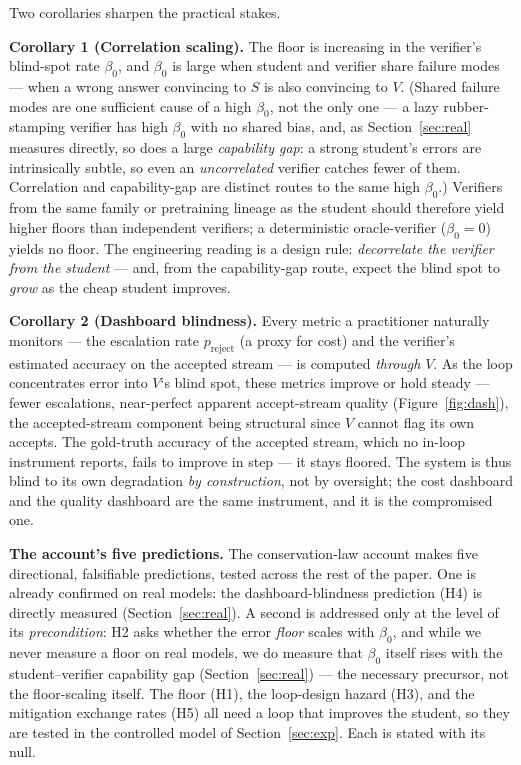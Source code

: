 \documentclass[11pt]{article}
\begin{document}
Two corollaries sharpen the practical stakes.

\textbf{Corollary 1 (Correlation scaling).} The floor is increasing in
the verifier's blind-spot rate \(\beta_{0}\), and \(\beta_{0}\) is large
when student and verifier share failure modes --- when a wrong answer
convincing to \(S\) is also convincing to \(V\). (Shared failure modes
are one sufficient cause of a high \(\beta_{0}\), not the only one --- a
lazy rubber-stamping verifier has high \(\beta_{0}\) with no shared
bias, and, as Section~\ref{sec:real} measures directly, so does a large
\emph{capability gap}: a strong student's errors are intrinsically
subtle, so even an \emph{uncorrelated} verifier catches fewer of them.
Correlation and capability-gap are distinct routes to the same high
\(\beta_{0}\).) Verifiers from the same family or pretraining lineage as
the student should therefore yield higher floors than independent
verifiers; a deterministic oracle-verifier (\(\beta_{0} = 0\)) yields no
floor. The engineering reading is a design rule: \emph{decorrelate the
verifier from the student} --- and, from the capability-gap route,
expect the blind spot to \emph{grow} as the cheap student improves.

\textbf{Corollary 2 (Dashboard blindness).} Every metric a practitioner
naturally monitors --- the escalation rate \(p_{\text{reject}}\) (a
proxy for cost) and the verifier's estimated accuracy on the accepted
stream --- is computed \emph{through} \(V\). As the loop concentrates
error into \(V\)`s blind spot, these metrics improve or hold steady ---
fewer escalations, near-perfect apparent accept-stream quality
(Figure~\ref{fig:dash}), the accepted-stream component being structural
since \(V\) cannot flag its own accepts. The gold-truth accuracy of the
accepted stream, which no in-loop instrument reports, fails to improve
in step --- it stays floored. The system is thus blind to its own
degradation \emph{by construction}, not by oversight; the cost dashboard
and the quality dashboard are the same instrument, and it is the
compromised one.

\textbf{The account's five predictions.} The conservation-law account
makes five directional, falsifiable predictions, tested across the rest
of the paper. One is already confirmed on real models: the
dashboard-blindness prediction (H4) is directly measured
(Section~\ref{sec:real}). A second is addressed only at the level of its
\emph{precondition}: H2 asks whether the error \emph{floor} scales with
\(\beta_{0}\), and while we never measure a floor on real models, we do
measure that \(\beta_{0}\) itself rises with the student--verifier
capability gap (Section~\ref{sec:real}) --- the necessary precursor, not
the floor-scaling itself. The floor (H1), the loop-design hazard (H3),
and the mitigation exchange rates (H5) all need a loop that improves the
student, so they are tested in the controlled model of
Section~\ref{sec:exp}. Each is stated with its null.
\end{document}
